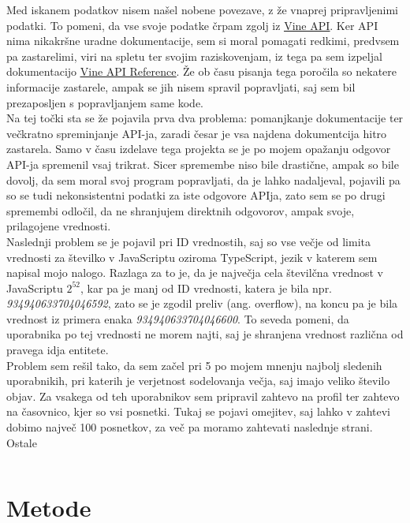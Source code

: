 \documentclass[a4paper,11pt]{article}
\begin{document}
Med iskanem podatkov nisem našel nobene povezave, z že vnaprej pripravljenimi podatki. To pomeni, da vse svoje podatke črpam zgolj iz \href{https://api.vineapp.com}{\underline{Vine API}}. Ker API nima nikakršne uradne dokumentacije, sem si moral pomagati redkimi, predvsem pa zastarelimi, viri na spletu ter svojim raziskovenjam, iz tega pa sem izpeljal dokumentacijo \href{https://github.com/markogresak/vine-data-mining/blob/master/API-reference.md}{\underline{Vine API Reference}}. Že ob času pisanja tega poročila so nekatere informacije zastarele, ampak se jih nisem spravil popravljati, saj sem bil prezaposljen s popravljanjem same kode.
\\
Na tej točki sta se že pojavila prva dva problema: pomanjkanje dokumentacije ter večkratno spreminjanje API-ja, zaradi česar je vsa najdena dokumentcija hitro zastarela. Samo v času izdelave tega projekta se je po mojem opažanju odgovor API-ja spremenil vsaj trikrat. Sicer spremembe niso bile drastične, ampak so bile dovolj, da sem moral svoj program popravljati, da je lahko nadaljeval, pojavili pa so se tudi nekonsistentni podatki za iste odgovore APIja, zato sem se po drugi spremembi odločil, da ne shranjujem direktnih odgovorov, ampak svoje, prilagojene vrednosti.
\\
Naslednji problem se je pojavil pri ID vrednostih, saj so vse večje od limita vrednosti za številko v JavaScriptu oziroma TypeScript, jezik v katerem sem napisal mojo nalogo. Razlaga za to je, da je največja cela številčna vrednost v JavaScriptu \(2^{52}\), kar pa je manj od ID vrednosti, katera je bila npr. \textit{934940633704046592}, zato se je zgodil preliv (ang. overflow), na koncu pa je bila vrednost iz primera enaka \textit{934940633704046600}. To seveda pomeni, da uporabnika po tej vrednosti ne morem najti, saj je shranjena vrednost različna od pravega idja entitete.
\\
Problem sem rešil tako, da sem začel pri 5 po mojem mnenju najbolj sledenih uporabnikih, pri katerih je verjetnost sodelovanja večja, saj imajo veliko število objav. Za vsakega od teh uporabnikov sem pripravil zahtevo na profil ter zahtevo na časovnico, kjer so vsi posnetki. Tukaj se pojavi omejitev, saj lahko v zahtevi dobimo največ 100 posnetkov, za več pa moramo zahtevati naslednje strani. Ostale

\begin{verbatim}

\end{verbatim}

\section{Metode}
\end{document}
